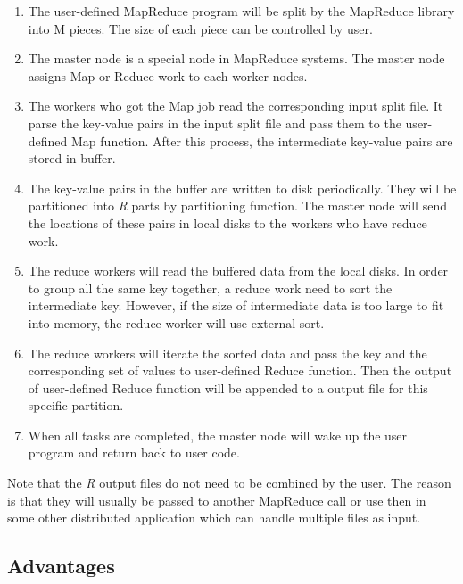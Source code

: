 \documentclass[sigconf, nonacm]{acmart}
\begin{document}
\begin{enumerate}
    \item The user-defined MapReduce program will be split by the MapReduce library into M pieces. The size of each piece can be controlled by user. 
    
    \item The master node is a special node in MapReduce systems. The master node assigns Map or Reduce work to each worker nodes.
    
    \item The workers who got the Map job read the corresponding input split file. It parse the key-value pairs in the input split file and pass them to the user-defined Map function. After this process, the intermediate key-value pairs are stored in buffer. 
    
    \item The key-value pairs in the buffer are written to disk periodically. They will be partitioned into \textit{R} parts by partitioning function. The master node will send the locations of these pairs in local disks to the workers who have reduce work.
    
    \item The reduce workers will read the buffered data from the local disks. In order to group all the same key together, a reduce work need to sort the intermediate key. However, if the size of intermediate data is too large to fit into memory, the reduce worker will use external sort.
    
    \item The reduce workers will iterate the sorted data and pass the key and the corresponding set of values to user-defined Reduce function. Then the output of user-defined Reduce function will be appended to a output file for this specific partition.
    
    \item When all tasks are completed, the master node will wake up the user program and return back to user code.
\end{enumerate}

Note that the \textit{R} output files do not need to be combined by the user. The reason is that they will usually be passed to another MapReduce call or use then in some other distributed application which can handle multiple files as input.

\subsection{Advantages}
\end{document}
